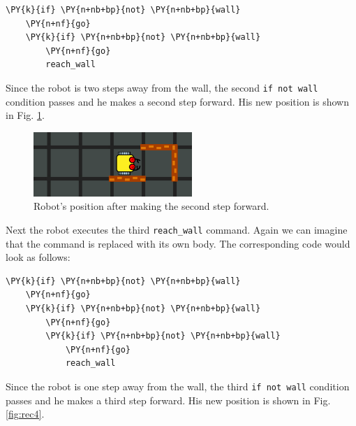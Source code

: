 \begin{bbox}
\begin{Verbatim}[commandchars=\\\{\}]
\PY{k}{if} \PY{n+nb+bp}{not} \PY{n+nb+bp}{wall}
    \PY{n+nf}{go}
    \PY{k}{if} \PY{n+nb+bp}{not} \PY{n+nb+bp}{wall}
        \PY{n+nf}{go}
        reach_wall
\end{Verbatim}
\end{bbox}
\vspace{6mm}

\noindent
Since the robot is two steps away from the wall, the second {\tt if not wall} condition passes and 
he makes a second step forward. His new position is shown in Fig. \ref{fig:rec3}.

\begin{figure}[!ht]
\begin{center}
\includegraphics[width=6cm]{img/rec-3.png}
\end{center}
\vspace{-4mm}
\caption{Robot's position after making the second step forward.}
\label{fig:rec3}
\vspace{-4mm}
\end{figure}
\noindent
Next the robot executes the third {\tt reach\_wall} command. Again we can imagine that the command 
is replaced with its own body. The corresponding code would look as follows:\\

\begin{bbox}
\begin{Verbatim}[commandchars=\\\{\}]
\PY{k}{if} \PY{n+nb+bp}{not} \PY{n+nb+bp}{wall}
    \PY{n+nf}{go}
    \PY{k}{if} \PY{n+nb+bp}{not} \PY{n+nb+bp}{wall}
        \PY{n+nf}{go}
        \PY{k}{if} \PY{n+nb+bp}{not} \PY{n+nb+bp}{wall}
            \PY{n+nf}{go}
            reach_wall
\end{Verbatim}
\end{bbox}
\vspace{6mm}

\noindent
Since the robot is one step away from the wall, the third {\tt if not wall} condition passes and 
he makes a third step forward. His new position is shown in Fig. \ref{fig:rec4}.

